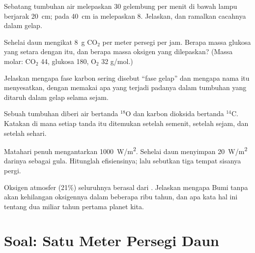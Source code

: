 \begin{exercise}[$\star\star$]\label{exo:g12:photosynthesis:10}
Sebatang tumbuhan air melepaskan 30 gelembung per menit di bawah lampu
berjarak \qty{20}{cm}; pada \qty{40}{cm} ia melepaskan 8. Jelaskan, dan
ramalkan cacahnya dalam gelap.
\end{exercise}

\begin{exercise}[$\star\star$]\label{exo:g12:photosynthesis:11}
Sehelai daun mengikat \qty{8}{g} $\mathrm{CO_2}$ per meter persegi per
jam. Berapa massa glukosa yang setara dengan itu, dan berapa massa
oksigen yang dilepaskan? (Massa molar: $\mathrm{CO_2}$ 44, glukosa 180,
$\mathrm{O_2}$ 32 \unit{g/mol}.)
\end{exercise}

\begin{exercise}[$\star\star\star$]\label{exo:g12:photosynthesis:12}
Jelaskan mengapa fase karbon sering disebut ``fase gelap'' dan mengapa
nama itu menyesatkan, dengan memakai apa yang terjadi padanya dalam
tumbuhan yang ditaruh dalam gelap selama sejam.
\end{exercise}

\begin{exercise}[$\star\star\star$]\label{exo:g12:photosynthesis:13}
Sebuah tumbuhan diberi air bertanda $^{18}$O dan karbon dioksida
bertanda $^{14}$C. Katakan di mana setiap tanda itu ditemukan setelah
semenit, setelah sejam, dan setelah sehari.
\end{exercise}

\begin{exercise}[$\star\star\star$]\label{exo:g12:photosynthesis:14}
Matahari penuh mengantarkan \qty{1000}{W/m^2}. Sehelai daun menyimpan
\qty{20}{W/m^2} darinya sebagai gula. Hitunglah efisiensinya; lalu
sebutkan tiga tempat sisanya pergi.
\end{exercise}

\begin{exercise}[$\star\star\star$]\label{exo:g12:photosynthesis:15}
Oksigen atmosfer (21\%) seluruhnya berasal dari . Jelaskan
mengapa Bumi tanpa  akan kehilangan oksigennya dalam
beberapa ribu tahun, dan apa kata hal ini tentang dua miliar tahun
pertama planet kita.
\end{exercise}

\section{Soal: Satu Meter Persegi Daun}

